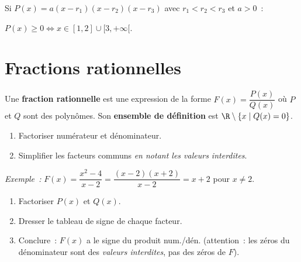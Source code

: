 \begin{prop}
Si $P(x) = a(x-r_1)(x-r_2)(x-r_3)$ avec $r_1 < r_2 < r_3$ et $a>0$~:
\begin{center}
\end{center}
\end{prop}

\begin{ex}[Signe de $P(x) = (x-1)(x-2)(x-3)$]
\begin{center}
\end{center}
$P(x) \geq 0 \Leftrightarrow x \in [1,2]\cup[3,+\infty[$.
\end{ex}

\section{Fractions rationnelles}

\begin{defn}
Une \textbf{fraction rationnelle} est une expression de la forme
$F(x) = \dfrac{P(x)}{Q(x)}$ o\`u $P$ et $Q$ sont des polyn\^omes.
Son \textbf{ensemble de d\'efinition} est $\R \setminus \{x \mid Q(x)=0\}$.
\end{defn}

\begin{methode}
\begin{enumerate}
  \item Factoriser num\'erateur et d\'enominateur.
  \item Simplifier les facteurs communs \emph{en notant les valeurs interdites}.
\end{enumerate}
\emph{Exemple~:} $F(x) = \dfrac{x^2-4}{x-2} = \dfrac{(x-2)(x+2)}{x-2} = x+2$
pour $x \ne 2$.
\end{methode}

\begin{methode}
\begin{enumerate}
  \item Factoriser $P(x)$ et $Q(x)$.
  \item Dresser le tableau de signe de chaque facteur.
  \item Conclure~: $F(x)$ a le signe du produit num./d\'en.
        (attention~: les z\'eros du d\'enominateur sont des \emph{valeurs interdites},
        pas des z\'eros de $F$).
\end{enumerate}
\end{methode}

